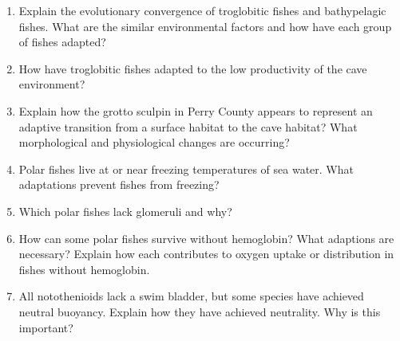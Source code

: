 \documentclass[letterpaper]{tufte-handout}
\begin{document}
\begin{enumerate}

	\item Explain the evolutionary convergence of troglobitic fishes and bathypelagic fishes.  What are the similar environmental factors and how have each group of fishes adapted?

	\item How have troglobitic fishes adapted to the low productivity of the cave environment?

	\item Explain how the grotto sculpin in Perry County appears to represent an adaptive transition from a surface habitat to the cave habitat?  What morphological and physiological changes are occurring?

	\item Polar fishes live at or near freezing temperatures of sea water.  What adaptations prevent fishes from freezing?

	\item Which polar fishes lack glomeruli and why?

	\item How can some polar fishes survive without hemoglobin?  What adaptions are necessary?  Explain how each contributes to oxygen uptake or distribution in fishes without hemoglobin.

	\item All notothenioids lack a swim bladder, but some species have achieved neutral buoyancy.  Explain how they have achieved neutrality.  Why is this important?

\end{enumerate}
\end{document}
